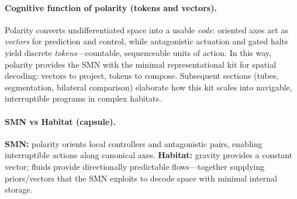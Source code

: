 
\paragraph{Cognitive function of polarity (tokens and vectors).}
Polarity converts undifferentiated space into a usable \emph{code}: oriented axes act as \emph{vectors} for prediction and control, while antagonistic actuation and gated halts yield discrete \emph{tokens}—countable, sequenceable units of action. In this way, polarity provides the SMN with the minimal representational kit for spatial decoding: vectors to project, tokens to compose. Subsequent sections (tubes, segmentation, bilateral comparison) elaborate how this kit scales into navigable, interruptible programs in complex habitats.


\paragraph{SMN vs Habitat (capsule).}
\textbf{SMN:} polarity orients local controllers and antagonistic pairs, enabling interruptible actions along canonical axes.
\textbf{Habitat:} gravity provides a constant vector; fluids provide directionally predictable flows—together supplying priors/vectors that the SMN exploits to decode space with minimal internal storage.

